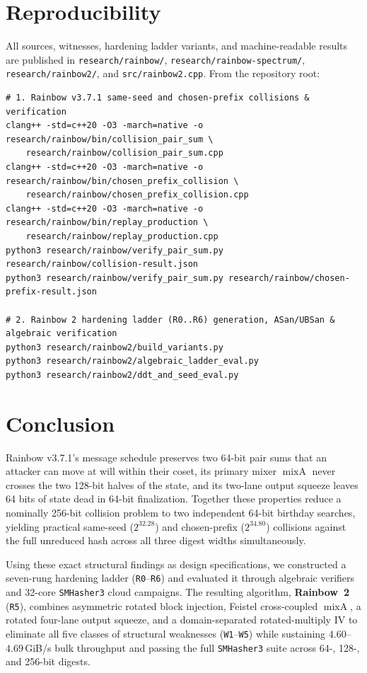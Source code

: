 \documentclass[10pt]{article}
\theoremstyle{definition}
\newcommand{\mixA}{\operatorname{mixA}}
\newcommand{\code}[1]{\texttt{#1}}
\begin{document}
\section{Reproducibility}
\label{sec:repro}

All sources, witnesses, hardening ladder variants, and machine-readable results are published in \code{research/rainbow/}, \code{research/rainbow-spectrum/}, \code{research/rainbow2/}, and \code{src/rainbow2.cpp}. From the repository root:

\begin{lstlisting}[style=code]
# 1. Rainbow v3.7.1 same-seed and chosen-prefix collisions & verification
clang++ -std=c++20 -O3 -march=native -o research/rainbow/bin/collision_pair_sum \
    research/rainbow/collision_pair_sum.cpp
clang++ -std=c++20 -O3 -march=native -o research/rainbow/bin/chosen_prefix_collision \
    research/rainbow/chosen_prefix_collision.cpp
clang++ -std=c++20 -O3 -march=native -o research/rainbow/bin/replay_production \
    research/rainbow/replay_production.cpp
python3 research/rainbow/verify_pair_sum.py research/rainbow/collision-result.json
python3 research/rainbow/verify_pair_sum.py research/rainbow/chosen-prefix-result.json

# 2. Rainbow 2 hardening ladder (R0..R6) generation, ASan/UBSan & algebraic verification
python3 research/rainbow2/build_variants.py
python3 research/rainbow2/algebraic_ladder_eval.py
python3 research/rainbow2/ddt_and_seed_eval.py
\end{lstlisting}

\section{Conclusion}
\label{sec:conclusion}

Rainbow v3.7.1's message schedule preserves two 64-bit pair sums that an attacker can move at will within their coset, its primary mixer $\mixA$ never crosses the two 128-bit halves of the state, and its two-lane output squeeze leaves 64 bits of state dead in 64-bit finalization. Together these properties reduce a nominally 256-bit collision problem to two independent 64-bit birthday searches, yielding practical same-seed ($2^{32.28}$) and chosen-prefix ($2^{34.80}$) collisions against the full unreduced hash across all three digest widths simultaneously.

Using these exact structural findings as design specifications, we constructed a seven-rung hardening ladder (\code{R0}--\code{R6}) and evaluated it through algebraic verifiers and 32-core \code{SMHasher3} cloud campaigns. The resulting algorithm, \textbf{Rainbow~2} (\code{R5}), combines asymmetric rotated block injection, Feistel cross-coupled $\mixA$, a rotated four-lane output squeeze, and a domain-separated rotated-multiply IV to eliminate all five classes of structural weaknesses (\code{W1}--\code{W5}) while sustaining $4.60$--$4.69$\,GiB/s bulk throughput and passing the full \code{SMHasher3} suite across 64-, 128-, and 256-bit digests.
\end{document}
